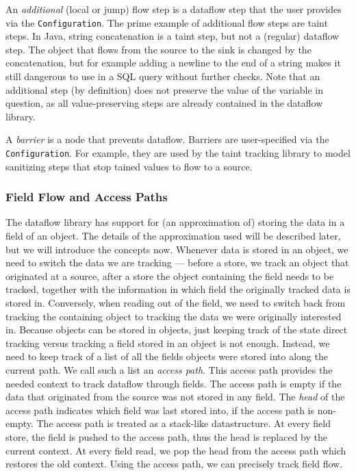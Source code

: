 An \emph{additional} (local or jump) flow step is a dataflow step that the user 
provides via the \texttt{Configuration}.
The prime example of additional flow steps are taint steps.
In Java, string concatenation is a taint step, but not a (regular) dataflow step.
The object that flows from the source to the sink is changed by the concatenation,
but for example adding a newline to the end of a string makes it still dangerous
to use in a SQL query without further checks.
Note that an additional step (by definition) does not preserve the value of the
variable in question, as all value-preserving steps are already contained in the
dataflow library.

A \emph{barrier} is a node that prevents dataflow.
Barriers are user-specified via the \texttt{Configuration}.
For example, they are used by the taint tracking library to model sanitizing steps
that stop tained values to flow to a source.


\subsubsection*{Field Flow and Access Paths}
The dataflow library has support for (an approximation of) storing the data in a
field of an object. The details of the approximation used will be described later, but
we will introduce the concepts now.
Whenever data is stored in an object, we need to switch the data we are tracking ---
before a store, we track an object that originated at a source, after a store the object
containing the field needs to be tracked, together with the information in which
field the originally tracked data is stored in.
Conversely, when reading out of the field, we need to switch back from tracking
the containing object to tracking the data we were originally interested in.
Because objects can be stored in objects, just keeping track of the state 
direct tracking versus tracking a field stored in an object is not enough.
Instead, we need to keep track of a list of all the fields objects were stored into along 
the current path.
We call such a list an \emph{access path}.
This access path provides the needed context to track dataflow through fields.
The access path is empty if the data that originated from the source was not 
stored in any field.
The \emph{head} of the access path indicates which field was last stored into,
if the access path is non-empty.
The access path is treated as a stack-like datastructure.
At every field store, the field is pushed to the access path, thus the head is
replaced by the current context.
At every field read, we pop the head from the access path which restores the old context.
Using the access path, we can precisely track field flow.

